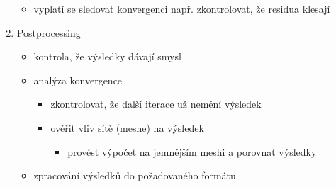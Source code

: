 \documentclass[letterpaper,10pt,czech]{sphinxmanual}
\begin{document}
\begin{enumerate}
\begin{itemize}
\item {} 
\sphinxAtStartPar
vyplatí se sledovat konvergenci \textendash{} např. zkontrolovat, že residua klesají

\end{itemize}

\item {} 
\sphinxAtStartPar
Post\sphinxhyphen{}processing
\begin{itemize}
\item {} 
\sphinxAtStartPar
kontrola, že výsledky dávají smysl

\item {} 
\sphinxAtStartPar
analýza konvergence
\begin{itemize}
\item {} 
\sphinxAtStartPar
zkontrolovat, že další iterace už nemění výsledek

\item {} 
\sphinxAtStartPar
ověřit vliv sítě (meshe) na výsledek
\begin{itemize}
\item {} 
\sphinxAtStartPar
provést výpočet na jemnějším meshi a porovnat výsledky

\end{itemize}

\end{itemize}

\item {} 
\sphinxAtStartPar
zpracování výsledků do požadovaného formátu

\end{itemize}

\end{enumerate}
\end{document}
